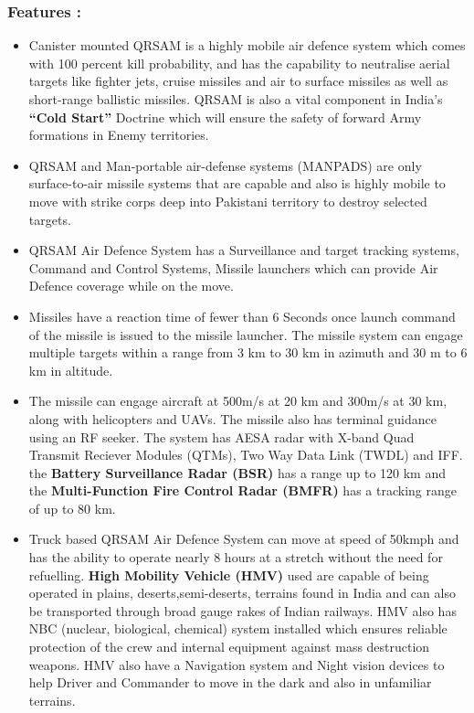 \documentclass[12pt]{article} %
\begin{document}
\subsubsection{Features :}
\begin{itemize}
\item[] Canister mounted QRSAM is a highly mobile air defence system which comes with 100 percent kill probability, and has the capability to neutralise aerial targets like fighter jets, cruise missiles and air ­to ­surface missiles as well as short-range ballistic missiles. QRSAM is also a vital component in India’s \textbf{“Cold Start”} Doctrine which will ensure the safety of forward Army formations in Enemy territories.
\item[] QRSAM and Man-portable air-defense systems (MANPADS) are only surface-to-air missile systems that are capable and also is highly mobile to move with strike corps deep into Pakistani territory to destroy selected targets.
\item[] QRSAM Air Defence System has a Surveillance and target tracking systems, Command and Control Systems, Missile launchers which can provide Air Defence coverage while on the move. 
\item[] Missiles have a reaction time of fewer than 6 Seconds once launch command of the missile is issued to the missile launcher. The missile system can engage multiple targets within a range from 3 km to 30 km in azimuth and 30 m to 6 km in altitude.
\item[] The missile can engage aircraft at 500m/s at 20 km and 300m/s at 30 km, along with helicopters and UAVs. The missile also has terminal guidance using an RF seeker. The system has AESA radar with X-band Quad Transmit Reciever Modules (QTMs), Two Way Data Link (TWDL) and IFF. the \textbf{Battery Surveillance Radar (BSR)} has a range up to 120 km and the\textbf{ Multi-Function Fire Control Radar (BMFR)} has a tracking range of up to 80 km. 
\item[] Truck based QRSAM Air Defence System can move at speed of 50kmph and has the ability to operate nearly 8 hours at a stretch without the need for refuelling. \textbf{High Mobility Vehicle (HMV)} used are capable of being operated in plains, deserts,semi-deserts, terrains found in India and can also be transported through broad gauge rakes of Indian railways. HMV also has NBC (nuclear, biological, chemical) system installed which ensures reliable protection of the crew and internal equipment against mass destruction weapons. HMV also have a Navigation system and Night vision devices to help Driver and Commander to move in the dark and also in unfamiliar terrains.

\end{itemize}
\end{document}
